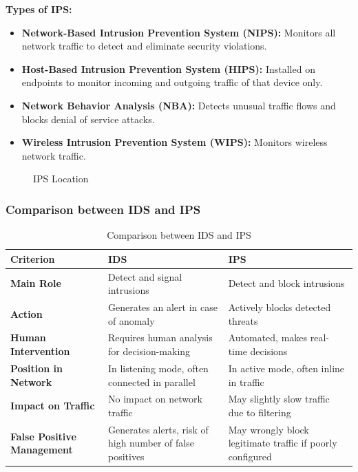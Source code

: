 \textbf{Types of IPS:}

\begin{itemize}
    \item \textbf{Network-Based Intrusion Prevention System (NIPS):} Monitors all network traffic to detect and eliminate security violations.
    \item \textbf{Host-Based Intrusion Prevention System (HIPS):} Installed on endpoints to monitor incoming and outgoing traffic of that device only.
    \item \textbf{Network Behavior Analysis (NBA):} Detects unusual traffic flows and blocks denial of service attacks.
    \item \textbf{Wireless Intrusion Prevention System (WIPS):} Monitors wireless network traffic.
\end{itemize}

\begin{figure}[H]
\centering
{}
\caption{IPS Location}
\label{fig:ips}
\end{figure}

\subsubsection{Comparison between IDS and IPS}

\begin{table}[H]
\centering
\caption{Comparison between IDS and IPS}
\label{tab:ids-ips}
\footnotesize
\setlength{\tabcolsep}{3pt}
\renewcommand{\arraystretch}{1.3}
\begin{tabular}{>{\RaggedRight\arraybackslash}p{3cm} p{5cm} p{5cm}}
\toprule
\rowcolor{tableheader}
\textbf{Criterion} & \textbf{IDS} & \textbf{IPS} \\
\midrule
\textbf{Main Role} & Detect and signal intrusions & Detect and block intrusions \\
\midrule
\textbf{Action} & Generates an alert in case of anomaly & Actively blocks detected threats \\
\midrule
\textbf{Human Intervention} & Requires human analysis for decision-making & Automated, makes real-time decisions \\
\midrule
\textbf{Position in Network} & In listening mode, often connected in parallel & In active mode, often inline in traffic \\
\midrule
\textbf{Impact on Traffic} & No impact on network traffic & May slightly slow traffic due to filtering \\
\midrule
\textbf{False Positive Management} & Generates alerts, risk of high number of false positives & May wrongly block legitimate traffic if poorly configured \\
\bottomrule
\end{tabular}
\end{table}

